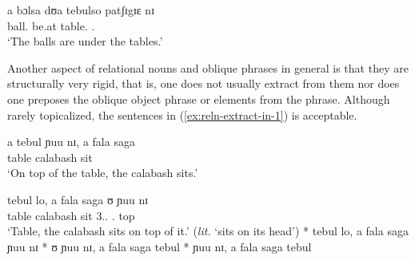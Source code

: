 \begin{exe}
\ex\label{ex:reln-plu-stomach}
\gll a bɔlsa dʊa tebulso patʃɪgɪɛ nɪ  \\
{\art} ball.{\pl}  be.at  table.{\pl}  {\reln .\pl} {\postp}\\
\glt `The balls are under the tables.'
\end{exe} 




Another aspect of relational nouns and oblique phrases in general is that
they are structurally very rigid, that is, one does not usually extract from
them nor does
one preposes the oblique object phrase or elements from the phrase. Although
rarely
topicalized, the
sentences in  (\ref{ex:reln-extract-in-1})  is acceptable. 


\begin{exe}
\ex\label{ex:reln-extract}
\begin{xlist}
 \ex\label{ex:reln-extract-in-1}

\gll  a tebul  ɲuu nɪ, a fala saga  \\
 {\art } table {\reln} {\postp}  {\art } calabash sit\\
\glt `On top of the table, the calabash sits.'

 \ex\label{ex:reln-extract-in-2}
\gll  tebul lo, a fala saga ʊ   ɲuu nɪ  \\
 table {\foc} {\art} calabash sit {3.\sg.\poss} {\reln. top} {\postp}   \\
\glt `Table, the calabash sits on top of it.' ({\it lit.} `sits on its head')
 \ex\label{ex:reln-extract-out-3}
* tebul lo, a fala saga  ɲuu nɪ
 \ex\label{ex:reln-extract-out-1}
 * ʊ   ɲuu nɪ, a fala saga tebul
 \ex\label{ex:reln-extract-out-2}
 *   ɲuu nɪ, a fala saga tebul

\end{xlist}
\end{exe} 



